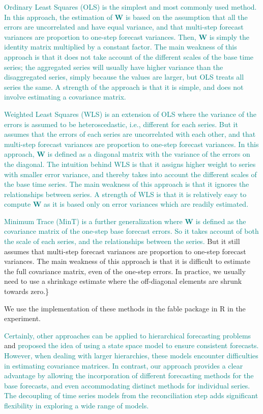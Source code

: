 \documentclass[
  authoryear,
  preprint,
  3p]{elsarticle}
\begin{document}
\textcolor{teal}{Ordinary Least Squares (OLS) is the simplest and most commonly used method. In this approach, the estimation of $\bm{W}$ is based on the assumption that all the errors are uncorrelated and have equal variance, and that multi-step forecast variances are proportion to one-step forecast variances. Then, $\bm{W}$ is simply the identity matrix multiplied by a constant factor. The main weakness of this approach is that it does not take account of the different scales of the base time series; the aggregated series will usually have higher variance than the disaggregated series, simply because the values are larger, but OLS treats all series the same. A strength of the approach is that it is simple, and does not involve estimating a covariance matrix.}

\textcolor{teal}{Weighted Least Squares (WLS) is an extension of OLS where the variance of the errors is assumed to be heteroscedastic, i.e., different for each series. But it assumes that the errors of each series are uncorrelated with each other, and that multi-step forecast variances are proportion to one-step forecast variances. In this approach, $\bm{W}$ is defined as a diagonal matrix with the variance of the errors on the diagonal. The intuition behind WLS is that it assigns higher weight to series with smaller error variance, and thereby takes into account the different scales of the base time series. The main weakness of this approach is that it ignores the relationships between series. A strength of WLS is that it is relatively easy to compute $\bm{W}$ as it is based only on error variances which are readily estimated.}

\textcolor{teal}{Minimum Trace (MinT) is a further generalization where $\bm{W}$ is defined as the covariance matrix of the one-step base forecast errors. So it takes account of both the scale of each series, and the relationships between the series.}
But it still assumes that multi-step forecast variances are proportion
to one-step forecast variances. The main weakness of this approach is
that it is difficult to estimate the full covariance matrix, even of the
one-step errors. In practice, we usually need to use a shrinkage
estimate where the off-diagonal elements are shrunk towards zero.\}

We use the implementation of these methods in the fable package in R in
the experiment.

\textcolor{teal}{Certainly, other approaches can be applied to hierarchical forecasting problems}
\citet{pennings2017integrated} and \citet{villegas2018supply}
\textcolor{teal}{proposed the idea of using a state space model to ensure consistent forecasts. However, when dealing with larger hierarchies, these models encounter difficulties in estimating covariance matrices. In contrast, our approach provides a clear advantage by allowing the incorporation of different forecasting methods for the base forecasts, and even accommodating distinct methods for individual series. The decoupling of time series models from the reconciliation step adds significant flexibility in exploring a wide range of models.}
\end{document}
